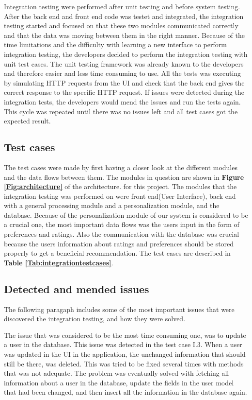 Integration testing were performed after unit testing and before system testing. After the back end and front end code was testet and integrated, the integration testing started and focused on that these two modules communicated correctly and that the data was moving between them in the right manner. 
Because of the time limitations and the difficulty with learning a new interface to perform integration testing, the developers decided to perform the integration testing with unit test cases. The unit testing framework was already known to the developers and therefore easier and less time consuming to use. All the tests was executing by simulating HTTP requests from the UI and check that the back end gives the correct response to the specific HTTP request. 
If issues were detected during the integration tests, the developers would mend the issues and run the tests again. This cycle was repeated until there was no issues left and all test cases got the expected result. \newline


\subsection{Test cases}
The test cases were made by first having a closer look at the different modules and the data flows between them. The modules in question are shown in \textbf{Figure \ref{Fig:architecture}} of the architecture. for this project. The modules that the integration testing was performed on were front end(User Interface), back end with a general processing module and a personalization module, and the database. Because of the personalization module of our system is considered to be a crucial one, the most important data flows was the users input in the form of preferences and ratings. Also the communication with the database was crucial because the users information about ratings and preferences should be stored properly to get a beneficial recommendation. The test cases are described in \textbf{Table \ref{Tab:integrationtestcases}}.


\subsection{Detected and mended issues}

The following paragaph includes some of the most important issues that were discovered the integration testing, and how they were solved.

The issue that was considered to be the most time consuming one, was to update a user in the database. This issue was detected in the test case I.3. When a user was updated in the UI in the application, the unchanged information that should still be there, was deleted. This was tried to be fixed several times with methods that was not adequate. The problem was eventually solved with fetching all information about a user in the database, update the fields in the user model that had been changed, and then insert all the information in the database again. \newline

